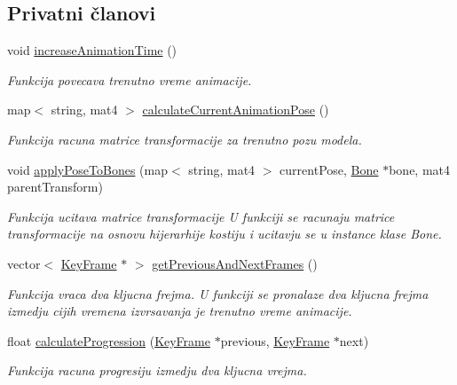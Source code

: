 \subsection*{Privatni članovi}
\begin{DoxyCompactItemize}
\item 
void \hyperlink{classanimation_1_1Animator_a688e72bb61014ad3431a8bbfd9e75c99}{increase\+Animation\+Time} ()
\begin{DoxyCompactList}\small\item\em Funkcija povecava trenutno vreme animacije. \end{DoxyCompactList}\item 
map$<$ string, mat4 $>$ \hyperlink{classanimation_1_1Animator_af42f79e412ade4f598612b6301b06f9a}{calculate\+Current\+Animation\+Pose} ()
\begin{DoxyCompactList}\small\item\em Funkcija racuna matrice transformacije za trenutno pozu modela. \end{DoxyCompactList}\item 
void \hyperlink{classanimation_1_1Animator_ad3a23a845327e2935845a8bfc1a934ce}{apply\+Pose\+To\+Bones} (map$<$ string, mat4 $>$ current\+Pose, \hyperlink{classmodel_1_1Bone}{Bone} $\ast$bone, mat4 parent\+Transform)
\begin{DoxyCompactList}\small\item\em Funkcija ucitava matrice transformacije U funkciji se racunaju matrice transformacije na osnovu hijerarhije kostiju i ucitavju se u instance klase Bone. \end{DoxyCompactList}\item 
vector$<$ \hyperlink{classanimation_1_1KeyFrame}{Key\+Frame} $\ast$ $>$ \hyperlink{classanimation_1_1Animator_af91ac2386b9606f8fa50d65f33fa0be0}{get\+Previous\+And\+Next\+Frames} ()
\begin{DoxyCompactList}\small\item\em Funkcija vraca dva kljucna frejma. U funkciji se pronalaze dva kljucna frejma izmedju cijih vremena izvrsavanja je trenutno vreme animacije. \end{DoxyCompactList}\item 
float \hyperlink{classanimation_1_1Animator_a050280aa6171aed0f34c481a3b7e0053}{calculate\+Progression} (\hyperlink{classanimation_1_1KeyFrame}{Key\+Frame} $\ast$previous, \hyperlink{classanimation_1_1KeyFrame}{Key\+Frame} $\ast$next)
\begin{DoxyCompactList}\small\item\em Funkcija racuna progresiju izmedju dva kljucna vrejma. \end{DoxyCompactList}\item 

\end{DoxyCompactItemize}
